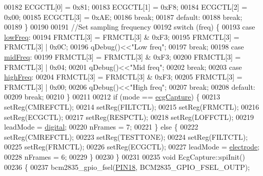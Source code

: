 \begin{DoxyCode}
00182         ECGCTL[0] = 0x81;
00183         ECGCTL[1] = 0xF8;
00184         ECGCTL[2] = 0x00;
00185         ECGCTL[3] = 0xAE;
00186         \textcolor{keywordflow}{break};
00187     \textcolor{keywordflow}{default}:
00188         \textcolor{keywordflow}{break};
00189     \}
00190 
00191     \textcolor{comment}{//Set sampling frequency}
00192     \textcolor{keywordflow}{switch} (freq) \{
00193     \textcolor{keywordflow}{case} \hyperlink{group__Device-Facade_ggaaf4f7677ca26944edc0f65195b8729f3acb281025a93800e7ed188605a7375838}{lowFreq}:
00194         FRMCTL[3] = FRMCTL[3] & 0xF3;
00195         FRMCTL[3] = FRMCTL[3] | 0x0C;
00196         qDebug()<<\textcolor{stringliteral}{"Low freq"};
00197         \textcolor{keywordflow}{break};
00198     \textcolor{keywordflow}{case} \hyperlink{group__Device-Facade_ggaaf4f7677ca26944edc0f65195b8729f3a2a968734e734a271ef5a52b83360122a}{midFreq}:
00199         FRMCTL[3] = FRMCTL[3] & 0xF3;
00200         FRMCTL[3] = FRMCTL[3] | 0x04;
00201         qDebug()<<\textcolor{stringliteral}{"Mid freq"};
00202         \textcolor{keywordflow}{break};
00203     \textcolor{keywordflow}{case} \hyperlink{group__Device-Facade_ggaaf4f7677ca26944edc0f65195b8729f3abd09d184c2c34f227532a8bc5fb90877}{highFreq}:
00204         FRMCTL[3] = FRMCTL[3] & 0xF3;
00205         FRMCTL[3] = FRMCTL[3] | 0x00;
00206         qDebug()<<\textcolor{stringliteral}{"High freq"};
00207         \textcolor{keywordflow}{break};
00208     \textcolor{keywordflow}{default}:
00209         \textcolor{keywordflow}{break};
00210     \}
00211 
00212     \textcolor{keywordflow}{if} (mode == \hyperlink{group__Device-Facade_ggabf6e5cc9109a573e29add762dc36df9ba9e4c8f425af52209ee3eb7c466852b22}{ecgCapture}) \{
00213         setReg(CMREFCTL);
00214         setReg(FILTCTL);
00215         setReg(FRMCTL);
00216         setReg(ECGCTL);
00217         setReg(RESPCTL);
00218         setReg(LOFFCTL);
00219         leadMode = \hyperlink{group__Device-Facade_gga1750ac59389b67ba4d9d2834dd7c2d9caf7786dce131009aa61ddfed4f8d8639b}{digital};
00220         nFrames = 7;
00221     \} \textcolor{keywordflow}{else} \{
00222         setReg(CMREFCTL);
00223         setReg(TESTTONE);
00224         setReg(FILTCTL);
00225         setReg(FRMCTL);
00226         setReg(ECGCTL);
00227         leadMode = \hyperlink{group__Device-Facade_gga1750ac59389b67ba4d9d2834dd7c2d9ca21cabce4f74afcf79d24897058fdd6b9}{electrode};
00228         nFrames = 6;
00229     \}
00230 \}
00231 
00235 \textcolor{keywordtype}{void} EcgCapture::spiInit()
00236 \{
00237     bcm2835\_gpio\_fsel(\hyperlink{ecgcapture_8cpp_a42dbee90edd2f61e90f501fa3f667761}{PIN18}, BCM2835\_GPIO\_FSEL\_OUTP);

\end{DoxyCode}
